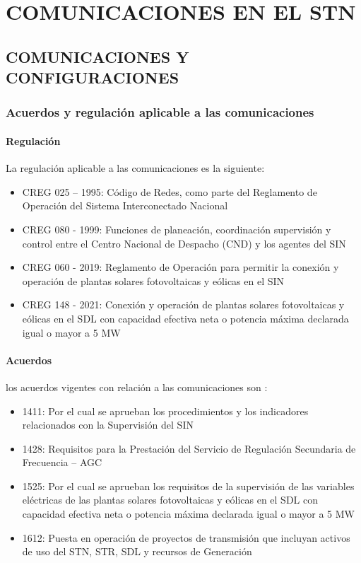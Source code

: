 \documentclass[a5paper]{book}%
\begin{document}
\part{COMUNICACIONES EN EL STN}

\chapter{COMUNICACIONES Y CONFIGURACIONES}

\section{Acuerdos y regulación aplicable a las comunicaciones}

\subsection{Regulación}
La regulación aplicable a las comunicaciones es la siguiente:

\begin{itemize}
\item CREG 025 – 1995: Código de Redes, como parte del Reglamento de Operación del Sistema Interconectado Nacional
\item CREG 080 - 1999: Funciones de planeación, coordinación supervisión y control entre el Centro Nacional de Despacho (CND) y los agentes del SIN
\item CREG 060 - 2019: Reglamento de Operación para permitir la conexión y operación de plantas solares fotovoltaicas y eólicas en el SIN
\item CREG 148 - 2021: Conexión y operación de plantas solares fotovoltaicas y eólicas en el SDL con capacidad efectiva neta o potencia máxima declarada igual o mayor a 5 MW
\end{itemize}

\subsection{Acuerdos}

los acuerdos vigentes con relación a las comunicaciones son :

\begin{itemize}
\item 1411: Por el cual se aprueban los procedimientos y los indicadores relacionados con la Supervisión del SIN
\item 1428: Requisitos para la Prestación del Servicio de Regulación Secundaria de Frecuencia – AGC
\item 1525: Por el cual se aprueban los requisitos de la supervisión de las variables eléctricas de las plantas solares fotovoltaicas y eólicas en el SDL con capacidad efectiva neta o potencia máxima declarada igual o mayor a 5 MW
\item 1612: Puesta en operación de proyectos de transmisión que incluyan activos de uso del STN, STR, SDL y recursos de Generación
  \end{itemize}
\end{document}
